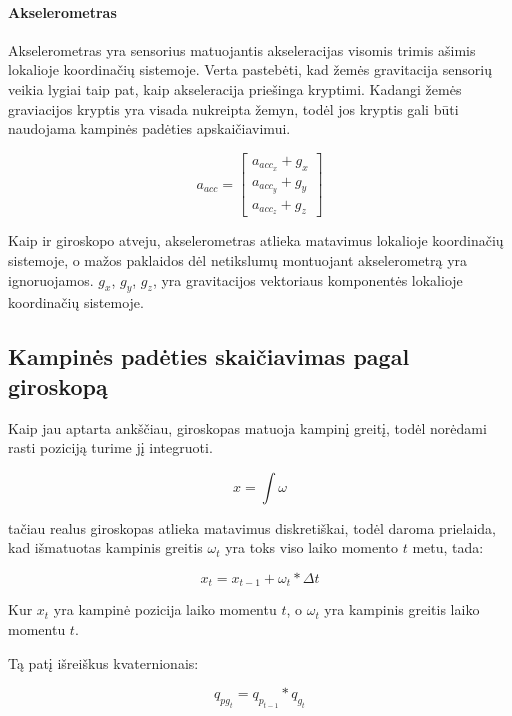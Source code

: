 \documentclass[12pt, a4paper, lithuanian, final]{article}
\begin{document}
\paragraph{Akselerometras} Akselerometras yra sensorius matuojantis akseleracijas visomis trimis ašimis lokalioje koordinačių sistemoje.
Verta pastebėti, kad žemės gravitacija sensorių veikia lygiai taip pat, kaip akseleracija priešinga kryptimi.
Kadangi žemės graviacijos kryptis yra visada nukreipta žemyn, todėl jos kryptis gali būti naudojama kampinės padėties apskaičiavimui.

\begin{equation}
	a_{acc} = \left[
		\begin{array}{c}
			a_{acc_x} + g_x \\
			a_{acc_y} + g_y \\
			a_{acc_z} + g_z
		\end{array}
	\right]
\end{equation}

Kaip ir giroskopo atveju, akselerometras atlieka matavimus lokalioje koordinačių sistemoje, o mažos paklaidos dėl netikslumų montuojant akselerometrą yra ignoruojamos.
$g_x$, $g_y$, $g_z$, yra gravitacijos vektoriaus komponentės lokalioje koordinačių sistemoje.



\subsection{Kampinės padėties skaičiavimas pagal giroskopą}

Kaip jau aptarta ankščiau, giroskopas matuoja kampinį greitį, todėl norėdami rasti poziciją turime jį integruoti.

\begin{equation}
	x = \int \omega
\end{equation}

tačiau realus giroskopas atlieka matavimus diskretiškai, todėl daroma prielaida, kad išmatuotas kampinis greitis $\omega_t$ yra toks viso laiko momento $t$ metu, tada:

\begin{equation}
	x_t = x_{t-1} + \omega_t * \Delta t
\end{equation}

Kur $x_t$ yra kampinė pozicija laiko momentu $t$, o $\omega_t$ yra kampinis greitis laiko momentu $t$.

Tą patį išreiškus kvaternionais:

\begin{equation}
	q_{pg_{t}} = q_{p_{t - 1}} * q_{g_{t}}
\end{equation}
\end{document}

